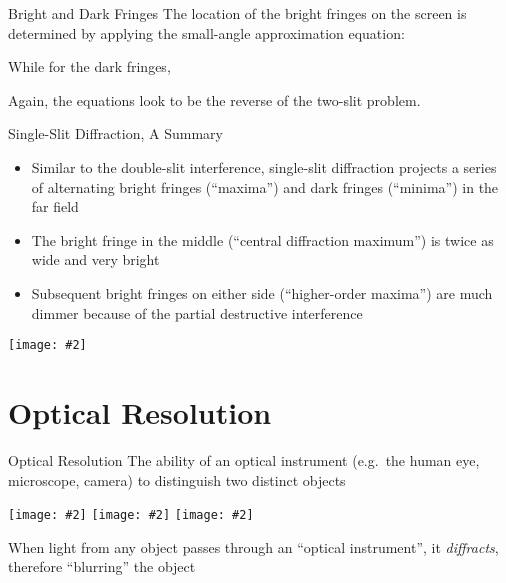 \documentclass[12pt,compress,aspectratio=169]{beamer}
\newcommand{\pic}[2]{\texttt{[image: \#2]}}
\newcommand{\eq}[2]{\vspace{#1}{\LARGE\begin{displaymath}#2\end{displaymath}}}
\begin{document}
\begin{frame}{Bright and Dark Fringes}
  The location of the bright fringes on the screen is determined by applying
  the small-angle approximation equation:
  
  \eq{-.2in}{
    \boxed{y_m=\left(m+\frac12\right)\frac{\lambda L}W}
  }

  While for the dark fringes, 

  \eq{-.2in}{
    \boxed{y_m=\frac{m\lambda L}W}
  }

  Again, the equations look to be the reverse of the two-slit problem.
\end{frame}



\begin{frame}{Single-Slit Diffraction, A Summary}
  \begin{itemize}
  \item Similar to the double-slit interference, single-slit diffraction
    projects a series of alternating bright fringes (``maxima'') and dark
    fringes (``minima'') in the far field
  \item The bright fringe in the middle (``central diffraction maximum'') is
    twice as wide  and very bright
  \item Subsequent bright fringes on either side (``higher-order maxima'') are
    much dimmer because of the partial destructive interference
  \end{itemize}
  \begin{center}
    \pic{.5}{graphics/Single_Slit_Diffraction}
  \end{center}
\end{frame}



\section{Optical Resolution}

\begin{frame}{Optical Resolution}
  The ability of an optical instrument (e.g.\ the human eye, microscope,
  camera) to distinguish two distinct objects
  \begin{center}
    \pic{.322}{graphics/resolve1}\hspace{.05in}
    \pic{.322}{graphics/resolve2}\hspace{.05in}
    \pic{.322}{graphics/resolve3}\hspace{.05in}
  \end{center}
  When light from any object passes through an ``optical instrument'', it
  \emph{diffracts}, therefore ``blurring'' the object
\end{frame}
\end{document}
